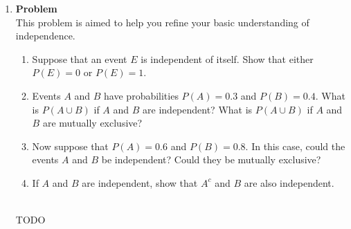 \documentclass[12pt]{article}
\newenvironment{Ex}{\textbf{Problem}\vspace{.75em}\\}{}
\begin{document}
\begin{enumerate}
\begin{Ex}
\begin{solution}
\begin{enumerate}
\begin{equation}
            &= 35
          \end{equation}
          There are $15$ combinations involving a particular
          electrical engineer, so the probablility that one particular
          electrical engineer must be on the committee is
          $\frac{3}{7}$.
        \item The total number of possible combinations for all
          mechanical engineers in the group can be written as
          \begin{equation}
            \label{eq:6b-mat}
            \begin{pmatrix}
              5 \\ 3
            \end{pmatrix} &= \frac{5!}{3!4!}
            &= 10
          \end{equation}
          There are 3 combinations involving two particular mechanical
          engineers on the committee, so the probability that two
          particular mechanical engineers are not together on the
          committee is $\frac{7}{10}$. The probability that two
          particular mechanical engineers are together is
          $\frac{3}{10}$.
        \end{enumerate}
      \end{solution}
    \end{Ex}
  \item
    \begin{Ex}
      This problem is aimed to help you refine your basic
      understanding of independence.
      \begin{enumerate}
      \item Suppose that an event $E$ is independent of itself. Show
        that either $P(E) = 0$ or $P(E) = 1$.
      \item Events $A$ and $B$ have probabilities $P(A)=0.3$ and
        $P(B)=0.4$. What is $P(A \cup B)$ if $A$ and $B$ are
        independent? What is $P(A \cup B)$ if $A$ and $B$ are
        mutually exclusive?
      \item Now suppose that $P(A) = 0.6$ and $P(B) = 0.8$. In this
        case, could the events $A$ and $B$ be independent? Could they
        be mutually exclusive?
      \item If $A$ and $B$ are independent, show that $A^c$ and $B$
        are also independent.
      \end{enumerate}
      \begin{solution} \hfill \\
        {\huge TODO}

\end{solution}
\end{Ex}
\end{enumerate}
\end{document}
